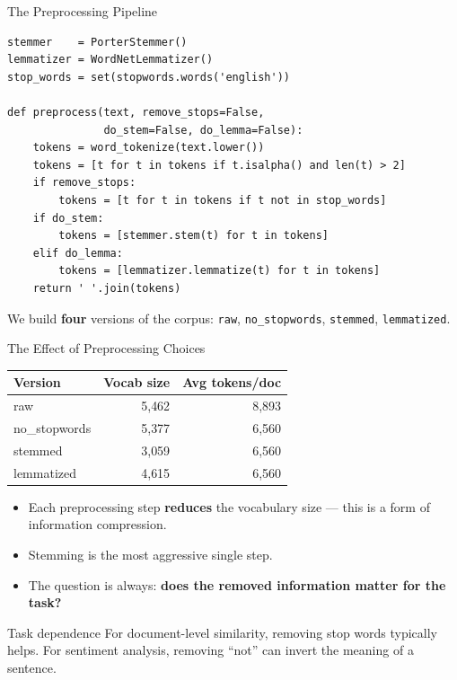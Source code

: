 \documentclass[aspectratio=169,11pt]{beamer}
\begin{document}
\begin{frame}[fragile]{The Preprocessing Pipeline}

\begin{lstlisting}
stemmer    = PorterStemmer()
lemmatizer = WordNetLemmatizer()
stop_words = set(stopwords.words('english'))

def preprocess(text, remove_stops=False,
               do_stem=False, do_lemma=False):
    tokens = word_tokenize(text.lower())
    tokens = [t for t in tokens if t.isalpha() and len(t) > 2]
    if remove_stops:
        tokens = [t for t in tokens if t not in stop_words]
    if do_stem:
        tokens = [stemmer.stem(t) for t in tokens]
    elif do_lemma:
        tokens = [lemmatizer.lemmatize(t) for t in tokens]
    return ' '.join(tokens)
\end{lstlisting}

\vspace{4pt}
We build \textbf{four} versions of the corpus:
\texttt{raw}, \texttt{no\_stopwords}, \texttt{stemmed},
\texttt{lemmatized}.

\end{frame}

\begin{frame}{The Effect of Preprocessing Choices}

\begin{table}
\centering
\begin{tabular}{lrr}
\toprule
\textbf{Version} & \textbf{Vocab size} & \textbf{Avg tokens/doc} \\
\midrule
raw            & 5{,}462 & 8{,}893 \\
no\_stopwords  & 5{,}377 & 6{,}560 \\
stemmed        & 3{,}059 & 6{,}560 \\
lemmatized     & 4{,}615 & 6{,}560 \\
\bottomrule
\end{tabular}
\end{table}

\vspace{6pt}
\begin{itemize}
  \item Each preprocessing step \textbf{reduces} the vocabulary size
        --- this is a form of information compression.
  \item Stemming is the most aggressive single step.
  \item The question is always: \textbf{does the removed information
        matter for the task?}
\end{itemize}

\begin{exampleblock}{Task dependence}
For document-level similarity, removing stop words typically helps.
For sentiment analysis, removing ``not'' can invert the meaning
of a sentence.
\end{exampleblock}

\end{frame}
\end{document}
